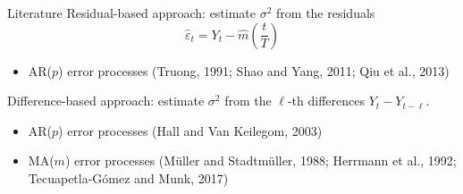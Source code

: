 \documentclass[10pt]{beamer}
\begin{document}
\begin{frame}{Literature}
	Residual-based approach: estimate $\sigma^2$ from the residuals $$\widehat{\varepsilon}_t = Y_t - \widehat{m}\left(\frac{t}{T}\right)$$
	\vskip -2mm
	\begin{itemize}
		\item AR($p$) error processes (Truong, 1991; Shao and Yang, 2011; Qiu et al., 2013)
	\end{itemize}\pause
	Difference-based approach: estimate $\sigma^2$ from the $\ell$-th differences $Y_t - Y_{t-\ell}$.
	\begin{itemize}
		\item AR($p$) error processes (Hall and Van Keilegom, 2003) 
		\item MA($m$) error processes (M{\"u}ller and Stadtm{\"u}ller, 1988; Herrmann et al., 1992; Tecuapetla-G{\'o}mez and Munk, 2017)
	\end{itemize}
\end{frame}



%
\end{document}
